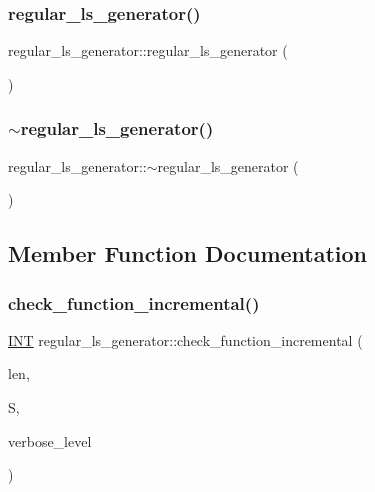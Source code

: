 \subsubsection{\texorpdfstring{regular\+\_\+ls\+\_\+generator()}{regular\_ls\_generator()}}
{\footnotesize\ttfamily regular\+\_\+ls\+\_\+generator\+::regular\+\_\+ls\+\_\+generator (\begin{DoxyParamCaption}{ }\end{DoxyParamCaption})}

\mbox{\label{classregular__ls__generator_a60eb6fcbda75c2882bf5625ebbfdf965}} 
\subsubsection{\texorpdfstring{$\sim$regular\+\_\+ls\+\_\+generator()}{~regular\_ls\_generator()}}
{\footnotesize\ttfamily regular\+\_\+ls\+\_\+generator\+::$\sim$regular\+\_\+ls\+\_\+generator (\begin{DoxyParamCaption}{ }\end{DoxyParamCaption})}



\subsection{Member Function Documentation}
\mbox{\label{classregular__ls__generator_a3ce4a3259efd50dfc514f286d498428e}} 
\subsubsection{\texorpdfstring{check\+\_\+function\+\_\+incremental()}{check\_function\_incremental()}}
{\footnotesize\ttfamily \mbox{\hyperlink{galois_8h_a09fddde158a3a20bd2dcadb609de11dc}{I\+NT}} regular\+\_\+ls\+\_\+generator\+::check\+\_\+function\+\_\+incremental (\begin{DoxyParamCaption}\item[{\mbox{\hyperlink{galois_8h_a09fddde158a3a20bd2dcadb609de11dc}{I\+NT}}}]{len,  }\item[{\mbox{\hyperlink{galois_8h_a09fddde158a3a20bd2dcadb609de11dc}{I\+NT}} $\ast$}]{S,  }\item[{\mbox{\hyperlink{galois_8h_a09fddde158a3a20bd2dcadb609de11dc}{I\+NT}}}]{verbose\+\_\+level }\end{DoxyParamCaption})}

